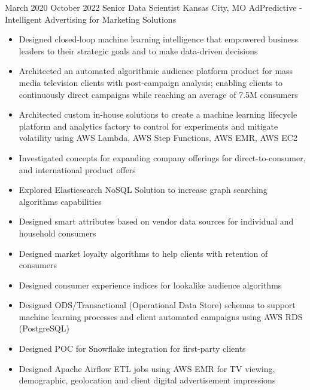 \ProjectExperience
{March 2020}
{October 2022}
{Senior Data Scientist}
{Kansas City, MO}
{AdPredictive - Intelligent Advertising for Marketing Solutions}
{
    \begin{itemize}
        \item Designed closed-loop machine learning intelligence that empowered
        business leaders to their strategic goals and to make data-driven
        decisions
        \item Architected an automated algorithmic audience platform product for
        mass media television clients with post-campaign analysis; enabling
        clients to continuously direct campaigns while reaching an average of
        7.5M consumers
        \item Architected custom in-house solutions to create a machine learning
        lifecycle platform and analytics factory to control for experiments and
        mitigate volatility using AWS Lambda, AWS Step Functions, AWS EMR, AWS
        EC2
    \end{itemize}
}
{
    \begin{itemize}
        \item Investigated concepts for expanding company offerings for
        direct-to-consumer, and international product offers
        \item Explored Elasticsearch NoSQL Solution to increase graph searching
        algorithms capabilities
        \item Designed smart attributes based on vendor data sources for
        individual and household consumers
        \item Designed market loyalty algorithms to help clients with retention
        of consumers
        \item Designed consumer experience indices for lookalike audience
        algorithms
        \item Designed ODS/Transactional (Operational Data Store) schemas to
        support machine learning processes and client automated campaigns using
        AWS RDS (PostgreSQL)
        \item Designed POC for Snowflake integration for first-party clients
        \item Designed Apache Airflow ETL jobs using AWS EMR for TV viewing,
        demographic, geolocation and client digital advertisement impressions
    \end{itemize}
}

